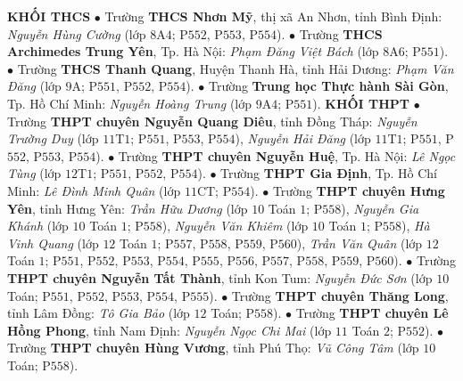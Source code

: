 \begin{multicols}{2}
	\textbf{\color{thachthuctoanhoc}KHỐI THCS}
	\vskip 0.05cm
	$\bullet$ Trường \textbf{\color{thachthuctoanhoc}THCS Nhơn Mỹ}, thị xã An Nhơn, tỉnh Bình Định: \textit{Nguyễn Hùng Cường} (lớp $8$A$4$; P$552$, P$553$, P$554$).
	\vskip 0.05cm
	$\bullet$ Trường \textbf{\color{thachthuctoanhoc}THCS Archimedes Trung Yên}, Tp. Hà Nội: \textit{Phạm Đăng Việt Bách} (lớp $8$A$6$; P$551$).
	\vskip 0.05cm
	$\bullet$ Trường \textbf{\color{thachthuctoanhoc}THCS Thanh Quang}, Huyện Thanh Hà, tỉnh Hải Dương: \textit{Phạm Văn Đăng} (lớp $9$A; P$551$, P$552$, P$554$).
	\vskip 0.05cm
	$\bullet$ Trường \textbf{\color{thachthuctoanhoc}Trung học Thực hành Sài Gòn}, Tp. Hồ Chí Minh: \textit{Nguyễn Hoàng Trung} (lớp $9$A$4$; P$551$).
	\vskip 0.05cm
	\textbf{\color{thachthuctoanhoc}KHỐI THPT}
	\vskip 0.05cm
	$\bullet$ Trường \textbf{\color{thachthuctoanhoc}THPT chuyên Nguyễn Quang Diêu}, tỉnh Đồng Tháp: \textit{Nguyễn Trường Duy} (lớp $11$T$1$; P$551$, P$553$, P$554$), \textit{Nguyễn Hải Đăng} (lớp $11$T$1$; P$551$, P$552$, P$553$, P$554$).
	\vskip 0.05cm
	$\bullet$ Trường \textbf{\color{thachthuctoanhoc}THPT chuyên Nguyễn Huệ}, Tp. Hà Nội: \textit{Lê Ngọc Tùng} (lớp $12$T$1$; P$551$, P$552$, P$554$).
	\vskip 0.05cm
	$\bullet$ Trường \textbf{\color{thachthuctoanhoc}THPT Gia Định}, Tp. Hồ Chí Minh: \textit{Lê Đình Minh Quân} (lớp $11$CT; P$554$).
	\vskip 0.05cm
	$\bullet$ Trường \textbf{\color{thachthuctoanhoc}THPT chuyên Hưng Yên}, tỉnh Hưng Yên: \textit{Trần Hữu Dương} (lớp $10$ Toán $1$; P$558$), \textit{Nguyễn Gia Khánh} (lớp $10$ Toán $1$; P$558$), \textit{Nguyễn Văn Khiêm} (lớp $10$ Toán $1$; P$558$), \textit{Hà Vinh Quang} (lớp $12$ Toán $1$; P$557$, P$558$, P$559$, P$560$), \textit{Trần Văn Quân} (lớp $12$ Toán $1$; P$551$, P$552$, P$553$, P$554$, P$555$, P$556$, P$557$, P$558$, P$559$, P$560$).
	\vskip 0.05cm
	$\bullet$ Trường \textbf{\color{thachthuctoanhoc}THPT chuyên Nguyễn Tất \linebreak Thành}, tỉnh Kon Tum: \textit{Nguyễn Đức Sơn} (lớp $10$ Toán; P$551$, P$552$, P$553$, P$554$, P$555$).
	\vskip 0.05cm
	$\bullet$ Trường \textbf{\color{thachthuctoanhoc}THPT chuyên Thăng Long}, tỉnh Lâm Đồng: \textit{Tô Gia Bảo} (lớp $12$ Toán; P$558$).
	\vskip 0.05cm
	$\bullet$ Trường \textbf{\color{thachthuctoanhoc}THPT chuyên Lê Hồng Phong}, tỉnh Nam Định: \textit{Nguyễn Ngọc Chi Mai} (lớp $11$ Toán $2$; P$552$).
	\vskip 0.05cm
	$\bullet$ Trường \textbf{\color{thachthuctoanhoc}THPT chuyên Hùng Vương}, \linebreak tỉnh Phú Thọ: \textit{Vũ Công Tâm} (lớp $10$ Toán; P$558$).

\end{multicols}
